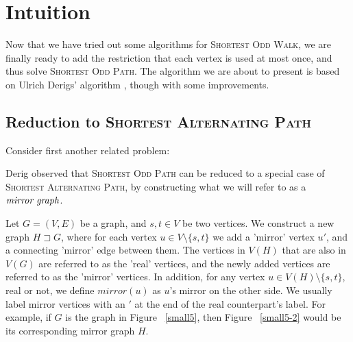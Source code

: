 \section{Intuition}
Now that we have tried out some algorithms for \textsc{Shortest Odd Walk}, we are finally ready to add the restriction that each vertex is used at most once, and thus solve \textsc{Shortest Odd Path}. The algorithm we are about to present is based on Ulrich Derigs' algorithm \cite{derigs_shortest_odd_path}, though with some improvements.

\subsection{Reduction to \textsc{Shortest Alternating Path}}
\label{reduction}
Consider first another related problem:


Derig observed that \textsc{Shortest Odd Path} can be reduced to a special case of \textsc{Shortest Alternating Path}, by constructing what we will refer to as a $\emph{mirror graph}$.

\begin{definition}
    Let $G = (V, E)$ be a graph, and $s,t \in V$ be two vertices.
    We construct a new graph $H \sqsupset G$, where for each vertex $u \in V \setminus \{s,t\}$ we add a 'mirror' vertex $u'$, and a connecting 'mirror' edge between them. 
    The vertices in $V(H)$ that are also in $V(G)$ are referred to as the 'real' vertices, and the newly added vertices are referred to as the 'mirror' vertices. In addition, for any vertex $u \in V(H) \setminus \{s,t\}$, real or not, we define $mirror(u)$ as $u$'s mirror on the other side. We usually label mirror vertices with an $'$ at the end of the real counterpart's label.
    For example, if $G$ is the graph in Figure ~\ref{small5}, then Figure ~\ref{small5-2} would be its corresponding mirror graph $H$.
\end{definition}

